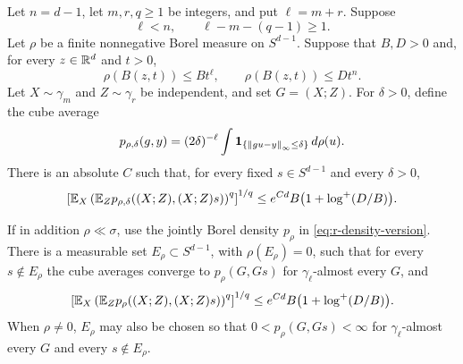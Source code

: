 \begin{theorem}
\label{thm:r-mixed-moment}
Let \(n=d-1\), let \(m,r,q\ge1\) be integers, and put
\(\ell=m+r\).  Suppose
\begin{equation}\label{eq:r-mixed-dimensions}
 \ell<n,\qquad \ell-m-(q-1)\ge1.
\end{equation}
Let \(\rho\) be a finite nonnegative Borel measure on \(S^{d-1}\).
Suppose that \(B,D>0\) and, for every \(z\in\mathbb R^d\) and \(t>0\),
\begin{equation}\label{eq:r-mixed-growth}
 \rho(B(z,t))\le Bt^\ell,\qquad
 \rho(B(z,t))\le Dt^n.
\end{equation}
Let \(X\sim\gamma_m\) and \(Z\sim\gamma_r\) be independent, and set
\(G=(X;Z)\).  For \(\delta>0\), define the cube average
\[
 p_{\rho,\delta}(g,y)
   =(2\delta)^{-\ell}\int
       \mathbf 1_{\{\left\lVert gu-y\right\rVert_\infty\le\delta\}}\,d\rho(u).
\]
There is an absolute \(C\) such that, for every fixed
\(s\in S^{d-1}\) and every \(\delta>0\),
\begin{equation}\label{eq:r-mixed-smoothed}
 \left[\mathbb E_X
       \left(\mathbb E_Z p_{\rho,\delta}((X;Z),(X;Z)s)\right)^q
 \right]^{1/q}
 \le e^{Cd}B\bigl(1+\log^+(D/B)\bigr).
\end{equation}

If in addition \(\rho\ll\sigma\), use the jointly Borel density
\(p_\rho\) in \eqref{eq:r-density-version}.  There is a measurable
set \(E_\rho\subset S^{d-1}\), with \(\rho(E_\rho)=0\), such that
for every \(s\notin E_\rho\) the cube averages converge to
\(p_\rho(G,Gs)\) for \(\gamma_\ell\)-almost every \(G\), and
\begin{equation}\label{eq:r-mixed-exact}
 \left[\mathbb E_X
       \left(\mathbb E_Zp_\rho((X;Z),(X;Z)s)\right)^q
 \right]^{1/q}
 \le e^{Cd}B\bigl(1+\log^+(D/B)\bigr).
\end{equation}
When \(\rho\ne0\), \(E_\rho\) may also be chosen so that
\(0<p_\rho(G,Gs)<\infty\) for \(\gamma_\ell\)-almost every \(G\)
and every \(s\notin E_\rho\).
\end{theorem}

